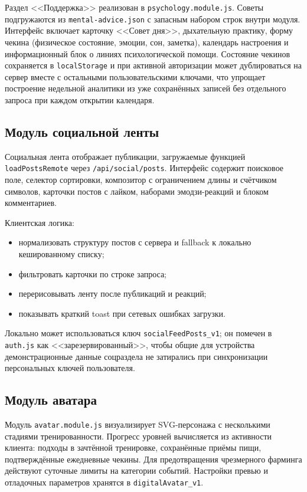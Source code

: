 Раздел <<Поддержка>> реализован в \texttt{psychology.module.js}. Советы подгружаются из \texttt{mental-advice.json} с запасным набором строк внутри модуля. Интерфейс включает карточку <<Совет дня>>, дыхательную практику, форму чекина (физическое состояние, эмоции, сон, заметка), календарь настроения и информационный блок о линиях психологической помощи. Состояние чекинов сохраняется в \texttt{localStorage} и при активной авторизации может дублироваться на сервер вместе с остальными пользовательскими ключами, что упрощает построение недельной аналитики из уже сохранённых записей без отдельного запроса при каждом открытии календаря.

\subsection{Модуль социальной ленты}

Социальная лента отображает публикации, загружаемые функцией \texttt{loadPostsRemote} через \texttt{/api/social/posts}. Интерфейс содержит поисковое поле, селектор сортировки, композитор с ограничением длины и счётчиком символов, карточки постов с лайком, наборами эмодзи-реакций и блоком комментариев.

Клиентская логика:
\begin{itemize}
	\item нормализовать структуру постов с сервера и fallback к локально кешированному списку;
	\item фильтровать карточки по строке запроса;
	\item перерисовывать ленту после публикаций и реакций;
	\item показывать краткий toast при сетевых ошибках загрузки.
\end{itemize}

Локально может использоваться ключ \texttt{socialFeedPosts\_v1}; он помечен в \texttt{auth.js} как <<зарезервированный>>, чтобы общие для устройства демонстрационные данные соцраздела не затирались при синхронизации персональных ключей пользователя.

\subsection{Модуль аватара}

Модуль \texttt{avatar.module.js} визуализирует SVG-персонажа с несколькими стадиями тренированности. Прогресс уровней вычисляется из активности клиента: подходы в зачтённой тренировке, сохранённые приёмы пищи, подтверждённые ежедневные чекины. Для предотвращения чрезмерного фарминга действуют суточные лимиты на категории событий. Настройки превью и отладочных параметров хранятся в \texttt{digitalAvatar\_v1}.

